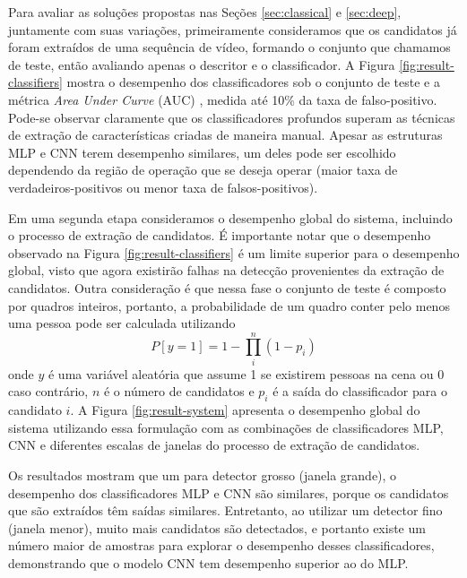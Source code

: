     Para avaliar as soluções propostas nas Seções \ref{sec:classical} e \ref{sec:deep}, juntamente com suas variações, primeiramente consideramos que os candidatos já foram extraídos de uma sequência de vídeo, formando o conjunto que chamamos de teste, então avaliando apenas o descritor e o classificador. A Figura \ref{fig:result-classifiers} mostra o desempenho dos classificadores sob o conjunto de teste e a métrica \textit{Area Under Curve} (AUC) \cite{evaluationMetrics}, medida até 10\% da taxa de falso-positivo. Pode-se observar claramente que os classificadores profundos superam as técnicas de extração de características criadas de maneira manual. Apesar as estruturas MLP e CNN terem desempenho similares, um deles pode ser escolhido dependendo da região de operação que se deseja operar (maior taxa de verdadeiros-positivos ou menor taxa de falsos-positivos).

    \begin{figure*}[!t]
    \centering
    \label{fig:result-classifiers-all}
    \hfil
    \label{fig:result-classifiers-all-zoom}
    \caption{Desempenho dos classificadores.}
    \label{fig:result-classifiers}
    \end{figure*}

    Em uma segunda etapa consideramos o desempenho global do sistema, incluindo o processo de extração de candidatos. É importante notar que o desempenho observado na Figura \ref{fig:result-classifiers} é um limite superior para o desempenho global, visto que agora existirão falhas na detecção provenientes da extração de candidatos. Outra consideração é que nessa fase o conjunto de teste é composto por quadros inteiros, portanto, a probabilidade de um quadro conter pelo menos uma pessoa pode ser calculada utilizando
    \begin{equation}
    P[y=1] = 1 - \prod_i^n (1-p_i)
    \end{equation}
    onde $y$ é uma variável aleatória que assume 1 se existirem pessoas na cena ou 0 caso contrário, $n$ é o número de candidatos e $p_i$ é a saída do classificador para o candidato $i$. A Figura \ref{fig:result-system} apresenta o desempenho global do sistema utilizando essa formulação com as combinações de classificadores MLP, CNN e diferentes escalas de janelas do processo de extração de candidatos.

    Os resultados mostram que um para detector grosso (janela grande), o desempenho dos classificadores MLP e CNN são similares, porque os candidatos que são extraídos têm saídas similares. Entretanto, ao utilizar um detector fino (janela menor), muito mais candidatos são detectados, e portanto existe um número maior de amostras para explorar o desempenho desses classificadores, demonstrando que o modelo CNN tem desempenho superior ao do MLP.

